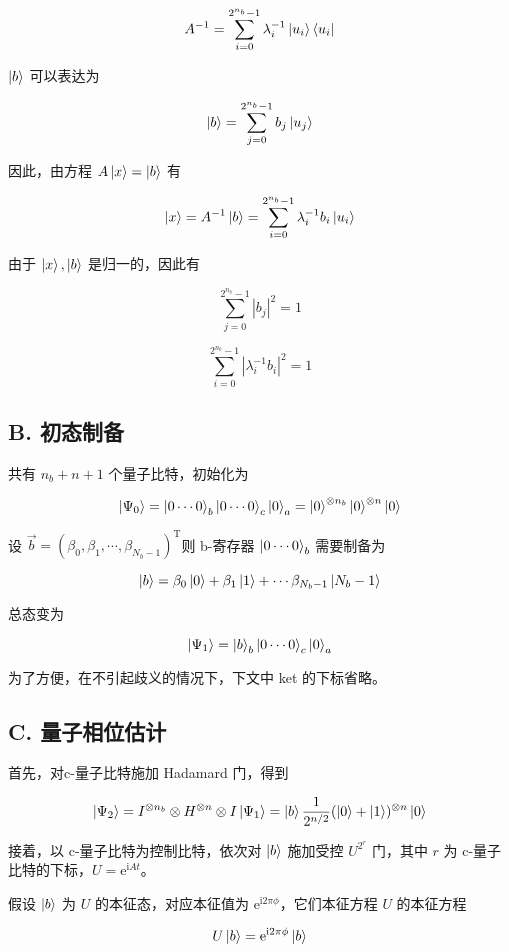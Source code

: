 \documentclass[aps,prl,twocolumn,groupedaddress]{revtex4-2}
\begin{document}
$$
A^{-1} = \sum_{i=0}^{2^{n_b}-1} \lambda_i^{-1} \ket{u_i}\bra{u_i}
$$

$\ket{b}$ 可以表达为

$$
\ket{b} = \sum_{j=0}^{2^{n_b}-1} b_j \ket{u_j}
$$

因此，由方程 $A\ket{x}=\ket{b}$ 有

$$
\ket{x} = A^{-1}\ket{b} = \sum_{i=0}^{2^{n_b}-1} \lambda_i^{-1}b_i \ket{u_i}
$$

由于 $\ket{x},\ket{b}$ 是归一的，因此有

$$
\sum_{j=0}^{2^{n_b}-1}\left|b_j \right|^2 = 1
$$

$$
\sum_{i=0}^{2^{n_b}-1} \left|\lambda_i^{-1}b_i\right|^2 = 1
$$

\subsection{B. 初态制备}

共有 $n_b+n+1$ 个量子比特，初始化为

$$
\ket{\Psi_0}
=\ket{0\cdots 0}_b\ket{0\cdots 0}_c\ket{0}_a
=\ket{0}^{\otimes n_b}\ket{0}^{\otimes n}\ket{0}
$$

设 $\vec{b} = \left(\beta_0,\beta_1,\cdots,\beta_{N_b-1} \right)^{\mathrm{T}} $则 b-寄存器 $\ket{0\cdots 0}_b$ 需要制备为

$$
\ket{b}
=\beta_0\ket{0}+\beta_1\ket{1}+\cdots\beta_{N_b-1}\ket{N_b-1}
$$

总态变为

$$
\ket{\Psi_1}
=\ket{b}_b\ket{0\cdots 0}_c\ket{0}_a
$$

为了方便，在不引起歧义的情况下，下文中 ket 的下标省略。

\subsection{C. 量子相位估计}

首先，对c-量子比特施加 Hadamard 门，得到

$$
\ket{\Psi_2}
=I^{\otimes n_b}\otimes H^{\otimes n}\otimes I\ket{\Psi_1}=
\ket{b}\frac{1 }{2^{n/2} } (\ket{0}+\ket{1})^{\otimes n} \ket{0}
$$

接着，以 c-量子比特为控制比特，依次对 $\ket{b}$ 施加受控 $U^{2^r}$ 门，其中 $r$ 为 c-量子比特的下标，$U=\mathrm{e}^{\mathrm{i}At}$。

假设 $\ket{b}$ 为 $U$ 的本征态，对应本征值为 $\mathrm{e}^{\mathrm{i}2\pi \phi}$，它们本征方程 $U$ 的本征方程

$$
U\ket{b} = \mathrm{e}^{\mathrm{i}2\pi\phi} \ket{b}
$$
\end{document}
